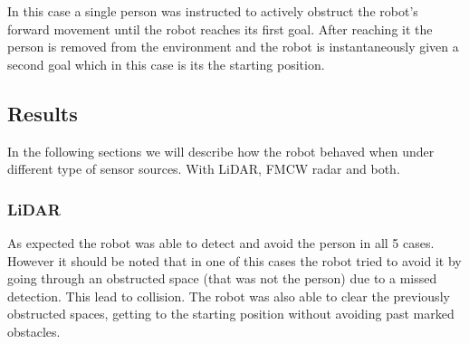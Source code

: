 In this case a single person was instructed to actively obstruct the robot's forward movement until the robot reaches its first goal. After reaching it the person is removed from the environment  and the robot is  instantaneously given a second goal which in this case is its the starting position. 

\subsection{Results}
In the following sections we will describe how the robot behaved when under different type of sensor sources. With \ac{LiDAR}, \ac{FMCW} \ac{radar} and both.

\subsubsection*{\ac{LiDAR}}
As expected the robot was able to detect and avoid the person in all 5 cases. However it should be noted that in one of this cases the robot tried to avoid it by going through an obstructed space (that was not the person) due to a missed detection. This lead to collision. The robot was also able to clear the previously obstructed spaces, getting to the starting position without avoiding past marked obstacles.


